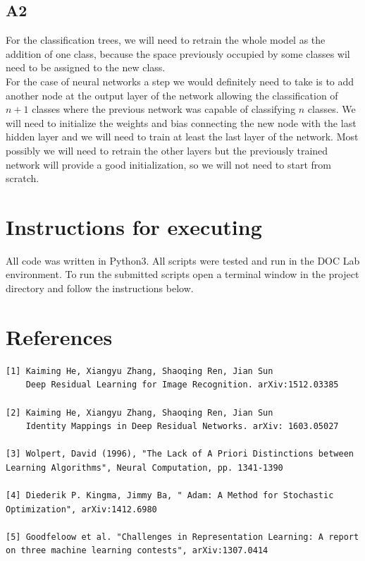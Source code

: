 \documentclass[12pt,twoside]{article}
\begin{document}
\subsection{A2}

For the classification trees, we will need to retrain the whole model as the addition of one class, because the space previously occupied by some classes wil need to be assigned to the new class.\\

For the case of neural networks a step we would definitely need to take is to add another node at the output layer of the network allowing the classification of $n+1$ classes where the previous network was capable of classifying $n$ classes. We will need to initialize the weights and bias connecting the new node with the last hidden layer and we will need to train at least the last layer of the network. Most possibly we will need to retrain the other layers but the previously trained network will provide a good initialization, so we will not need to start from scratch.


\newpage
\section{Instructions for executing}
All code was written in Python3. All scripts were tested and run in the DOC Lab environment. To run the submitted scripts open a terminal window in the project directory and follow the instructions below.\\

\section{References}

\begin{verbatim}
[1] Kaiming He, Xiangyu Zhang, Shaoqing Ren, Jian Sun
    Deep Residual Learning for Image Recognition. arXiv:1512.03385

[2] Kaiming He, Xiangyu Zhang, Shaoqing Ren, Jian Sun
    Identity Mappings in Deep Residual Networks. arXiv: 1603.05027
    
[3] Wolpert, David (1996), "The Lack of A Priori Distinctions between Learning Algorithms", Neural Computation, pp. 1341-1390

[4] Diederik P. Kingma, Jimmy Ba, " Adam: A Method for Stochastic Optimization", arXiv:1412.6980

[5] Goodfeloow et al. "Challenges in Representation Learning: A report 
on three machine learning contests", arXiv:1307.0414
\end{verbatim}
\end{document}

